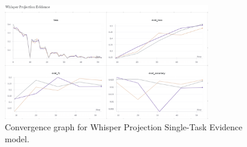 \documentclass{article}
\begin{document}
\begin{figure}[H]
    \centering
    \includegraphics[width=0.8\textwidth]{convergence_graphs/whisper_proj_evidence.png}
    \caption{Convergence graph for Whisper Projection Single-Task Evidence model.}
    \label{fig:whisper_proj_evidence}
\end{figure}
\end{document}
